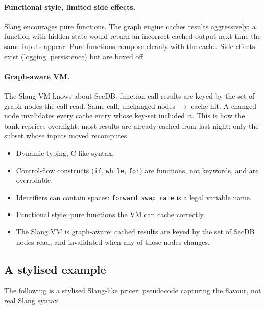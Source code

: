 \paragraph{Functional style, limited side effects.}  Slang
encourages pure functions.  The graph engine caches results
aggressively; a function with hidden state would return an
incorrect cached output next time the same inputs appear.  Pure
functions compose cleanly with the cache.  Side-effects exist
(logging, persistence) but are boxed off.

\paragraph{Graph-aware VM.}  The Slang VM knows about SecDB:
function-call results are keyed by the set of graph nodes the
call read.  Same call, unchanged nodes $\to$ cache hit.  A changed
node invalidates every cache entry whose key-set included it.
This is how the bank reprices overnight: most results are already
cached from last night; only the subset whose inputs moved
recomputes.

\begin{keyfactbox}
\begin{itemize}
  \item Dynamic typing, C-like syntax.
  \item Control-flow constructs (\texttt{if}, \texttt{while},
    \texttt{for}) are functions, not keywords, and are
    overridable.
  \item Identifiers can contain spaces:
    \texttt{forward swap rate} is a legal variable name.
  \item Functional style: pure functions the VM can cache
    correctly.
  \item The Slang VM is graph-aware: cached results are keyed by
    the set of SecDB nodes read, and invalidated when any of those
    nodes changes.
\end{itemize}
\end{keyfactbox}

\subsection{A stylised example}

The following is a stylised Slang-like pricer: pseudocode
capturing the flavour, not real Slang syntax.

